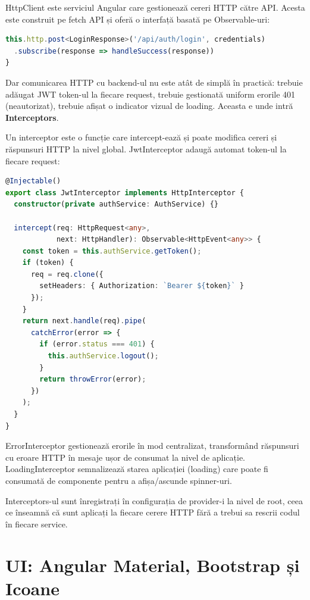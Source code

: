 HttpClient este serviciul Angular care gestionează cereri HTTP către API. Acesta este construit pe fetch API și oferă o interfață basată pe Observable-uri:

\begin{lstlisting}[language=TypeScript]
this.http.post<LoginResponse>('/api/auth/login', credentials)
  .subscribe(response => handleSuccess(response))
}
\end{lstlisting}

Dar comunicarea HTTP cu backend-ul nu este atât de simplă în practică: trebuie adăugat JWT token-ul la fiecare request, trebuie gestionată uniform erorile 401 (neautorizat), trebuie afișat o indicator vizual de loading. Aceasta e unde intră \textbf{Interceptors}.

Un interceptor este o funcție care intercept-ează și poate modifica cereri și răspunsuri HTTP la nivel global. JwtInterceptor adaugă automat token-ul la fiecare request:

\begin{lstlisting}[language=TypeScript]
@Injectable()
export class JwtInterceptor implements HttpInterceptor {
  constructor(private authService: AuthService) {}

  intercept(req: HttpRequest<any>,
            next: HttpHandler): Observable<HttpEvent<any>> {
    const token = this.authService.getToken();
    if (token) {
      req = req.clone({
        setHeaders: { Authorization: `Bearer ${token}` }
      });
    }
    return next.handle(req).pipe(
      catchError(error => {
        if (error.status === 401) {
          this.authService.logout();
        }
        return throwError(error);
      })
    );
  }
}
\end{lstlisting}

ErrorInterceptor gestionează erorile în mod centralizat, transformând răspunsuri cu eroare HTTP în mesaje ușor de consumat la nivel de aplicație. LoadingInterceptor semnalizează starea aplicației (loading) care poate fi consumată de componente pentru a afișa/ascunde spinner-uri.

Interceptors-ul sunt înregistrați în configurația de provider-i la nivel de root, ceea ce înseamnă că sunt aplicați la fiecare cerere HTTP fără a trebui sa rescrii codul în fiecare service.

\section{UI: Angular Material, Bootstrap și Icoane}

